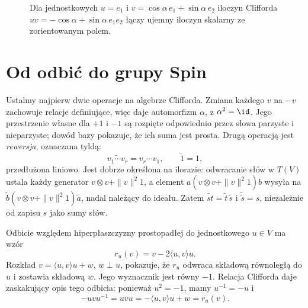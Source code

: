 \begin{figure}[!htbp]
\centering
{}
\caption{Dla jednostkowych $u=e_1$ i
$v=\cos\alpha\,e_1+\sin\alpha\,e_2$ iloczyn Clifforda
$uv=-\cos\alpha+\sin\alpha\,e_1e_2$ łączy
ujemny iloczyn skalarny ze zorientowanym polem.}
\label{fig:cliff-iloczyn}
\end{figure}

\section{Od odbić do grupy Spin}
\label{sec:spin-grupa}

Ustalmy najpierw dwie operacje na algebrze Clifforda.
Zmiana każdego $v$ na $-v$ zachowuje relacje definiujące,
więc daje automorfizm $\alpha$, z $\alpha^2=\id$.
Jego przestrzenie własne dla $+1$ i $-1$ są rozpięte
odpowiednio przez słowa parzyste i nieparzyste; dowód bazy
pokazuje, że ich suma jest prosta.
Drugą operacją jest \emph{rewersja}, oznaczana tyldą:
\[
 \widetilde{v_1\cdots v_r}=v_r\cdots v_1,\qquad
 \widetilde 1=1,
\]
przedłużona liniowo. Jest dobrze określona na ilorazie:
odwracanie słów w $T(V)$ ustala każdy generator
$v\otimes v+\|v\|^2 1$, a element $a(v\otimes v+\|v\|^2 1)b$
wysyła na $\widetilde b(v\otimes v+\|v\|^2 1)\widetilde a$,
nadal należący do ideału. Zatem
$\widetilde{st}=\widetilde t\,\widetilde s$ i
$\widetilde{\widetilde s}=s$, niezależnie od zapisu $s$ jako sumy słów.

Odbicie względem hiperpłaszczyzny prostopadłej
do jednostkowego $u\in V$ ma wzór
\begin{equation}\label{eq:spin-odbicie}
 r_u(v)=v-2\langle u,v\rangle u.
\end{equation}
Rozkład $v=\langle u,v\rangle u+w$, $w\perp u$,
pokazuje, że $r_u$ odwraca składową równoległą do $u$
i zostawia składową $w$. Jego wyznacznik jest równy $-1$.
Relacja Clifforda daje zaskakujący opis tego odbicia:
ponieważ $u^2=-1$, mamy $u^{-1}=-u$ i
\[
 -uvu^{-1}=uvu
 =-\langle u,v\rangle u+w
 =r_u(v).
\]

